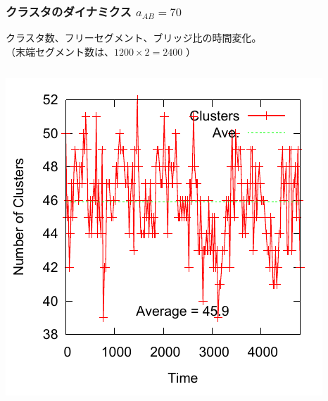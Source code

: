 \documentclass[12pt, dvipdfmx]{beamer}
\begin{document}
%
%
%

\begin{frame}
\frametitle{クラスタのダイナミクス $a_{AB}=70$}
クラスタ数、フリーセグメント、ブリッジ比の時間変化。\\
（末端セグメント数は、$1200\times2 = 2400$
）
\begin{columns}[T, totalwidth=\linewidth]
		\includegraphics[width=\columnwidth]{./fig/AB70/Domains.pdf}

\end{columns}
\end{frame}
\end{document}

